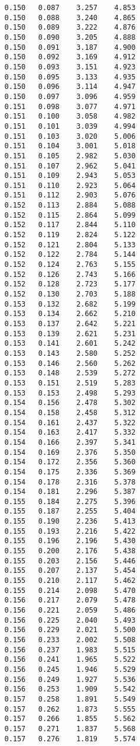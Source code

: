 \begin{verbatim}
   0.150   0.087    3.257    4.853
   0.150   0.088    3.240    4.865
   0.150   0.089    3.222    4.876
   0.150   0.090    3.205    4.888
   0.150   0.091    3.187    4.900
   0.150   0.092    3.169    4.912
   0.150   0.093    3.151    4.923
   0.150   0.095    3.133    4.935
   0.150   0.096    3.114    4.947
   0.150   0.097    3.096    4.959
   0.151   0.098    3.077    4.971
   0.151   0.100    3.058    4.982
   0.151   0.101    3.039    4.994
   0.151   0.103    3.020    5.006
   0.151   0.104    3.001    5.018
   0.151   0.105    2.982    5.030
   0.151   0.107    2.962    5.041
   0.151   0.109    2.943    5.053
   0.151   0.110    2.923    5.064
   0.151   0.112    2.903    5.076
   0.152   0.113    2.884    5.088
   0.152   0.115    2.864    5.099
   0.152   0.117    2.844    5.110
   0.152   0.119    2.824    5.122
   0.152   0.121    2.804    5.133
   0.152   0.122    2.784    5.144
   0.152   0.124    2.763    5.155
   0.152   0.126    2.743    5.166
   0.152   0.128    2.723    5.177
   0.152   0.130    2.703    5.188
   0.153   0.132    2.682    5.199
   0.153   0.134    2.662    5.210
   0.153   0.137    2.642    5.221
   0.153   0.139    2.621    5.231
   0.153   0.141    2.601    5.242
   0.153   0.143    2.580    5.252
   0.153   0.146    2.560    5.262
   0.153   0.148    2.539    5.272
   0.153   0.151    2.519    5.283
   0.153   0.153    2.498    5.293
   0.154   0.156    2.478    5.302
   0.154   0.158    2.458    5.312
   0.154   0.161    2.437    5.322
   0.154   0.163    2.417    5.332
   0.154   0.166    2.397    5.341
   0.154   0.169    2.376    5.350
   0.154   0.172    2.356    5.360
   0.154   0.175    2.336    5.369
   0.154   0.178    2.316    5.378
   0.154   0.181    2.296    5.387
   0.155   0.184    2.275    5.396
   0.155   0.187    2.255    5.404
   0.155   0.190    2.236    5.413
   0.155   0.193    2.216    5.422
   0.155   0.196    2.196    5.430
   0.155   0.200    2.176    5.438
   0.155   0.203    2.156    5.446
   0.155   0.207    2.137    5.454
   0.155   0.210    2.117    5.462
   0.155   0.214    2.098    5.470
   0.156   0.217    2.079    5.478
   0.156   0.221    2.059    5.486
   0.156   0.225    2.040    5.493
   0.156   0.229    2.021    5.500
   0.156   0.233    2.002    5.508
   0.156   0.237    1.983    5.515
   0.156   0.241    1.965    5.522
   0.156   0.245    1.946    5.529
   0.156   0.249    1.927    5.536
   0.156   0.253    1.909    5.542
   0.157   0.258    1.891    5.549
   0.157   0.262    1.873    5.555
   0.157   0.266    1.855    5.562
   0.157   0.271    1.837    5.568
   0.157   0.276    1.819    5.574

\end{verbatim}
